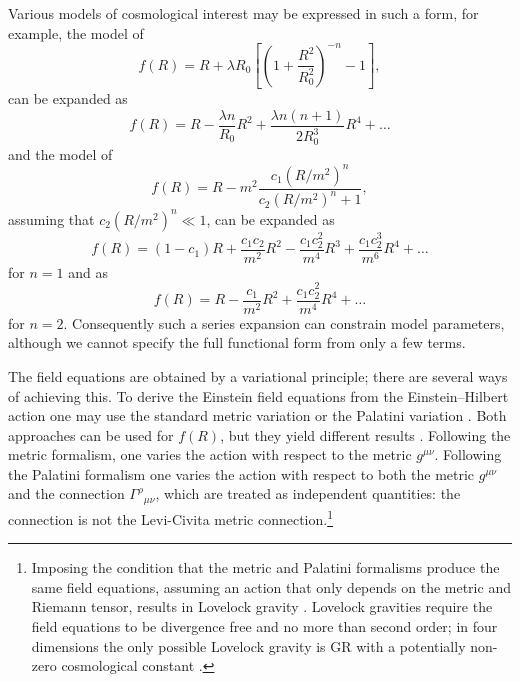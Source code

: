 Various models of cosmological interest may be expressed in such a form, for example, the model of \citet{Starobinsky2007}
\begin{equation}
f(R) = R + \lambda R_0 \left[\left(1 + \frac{R^2}{R_0^2}\right)^{-n} - 1\right],
\end{equation}
can be expanded as
\begin{equation}
f(R) = R - \frac{\lambda n}{R_0} R^2 + \frac{\lambda n (n + 1)}{2 R_0^3} R^4 + \ldots
\end{equation}
and the model of \citet{Hu2007}
\begin{equation}
f(R) = R - m^2\frac{c_1\left(R/m^2\right)^n}{c_2\left(R/m^2\right)^n + 1},
\end{equation}
assuming that $c_2(R/m^2)^n \ll 1$, can be expanded as
\begin{equation}
f(R) = (1 - c_1)R + \frac{c_1 c_2}{m^2}R^2 - \frac{c_1 c_2^2}{m^4}R^3 + \frac{c_1 c_2^3}{m^6}R^4 + \ldots 
\end{equation}
for $n = 1$ and as
\begin{equation}
f(R) = R - \frac{c_1}{m^2}R^2 + \frac{c_1 c_2^2}{m^4}R^4 + \ldots
\end{equation}
for $n = 2$. Consequently such a series expansion can constrain model parameters, although we cannot specify the full functional form from only a few terms.

The field equations are obtained by a variational principle; there are several ways of achieving this. To derive the Einstein field equations from the Einstein--Hilbert action one may use the standard metric variation or the Palatini variation \citep[section 21.2]{Misner1973}. Both approaches can be used for $f(R)$, but they yield different results \citep{Sotiriou2010, DeFelice2010}. Following the metric formalism, one varies the action with respect to the metric $g^{\mu\nu}$. Following the Palatini formalism one varies the action with respect to both the metric $g^{\mu\nu}$ and the connection ${\Gamma^\rho}_{\mu\nu}$, which are treated as independent quantities: the connection is not the Levi-Civita metric connection.\footnote{Imposing the condition that the metric and Palatini formalisms produce the same field equations, assuming an action that only depends on the metric and Riemann tensor, results in Lovelock gravity \citep{Exirifard2008}. Lovelock gravities require the field equations to be divergence free and no more than second order; in four dimensions the only possible Lovelock gravity is GR with a potentially non-zero cosmological constant \citep{Lovelock1970, Lovelock1971, Lovelock1972}.}

